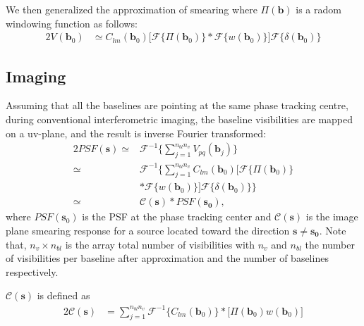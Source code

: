 We then generalized the approximation of smearing where $\Pi(\mathbf{b})$ is a radom windowing function 
as follows:
\begin{alignat*}{2}
V_{}(\mathbf{b}_0) &\simeq C_{lm}(\mathbf{b}_0)\Bigg[\mathcal{F}\Big\{\Pi(\mathbf{b}_0)\Big\}*\mathcal{F}\Big\{w(\mathbf{b}_0)\Big\}\Bigg]\mathcal{F}\Big\{\delta(\mathbf{b}_0)\Big\}
\end{alignat*}
\subsection{Imaging} 
Assuming that all the baselines are pointing at the same phase tracking centre, during conventional interferometric imaging,
the baseline visibilities are mapped on a uv-plane, and the result is inverse Fourier transformed:
\begin{alignat}{2}
PSF(\mathbf{s}) \simeq & \mathcal{F}^{-1}\Bigg\{\sum_{j=1}^{n_{bl}n_v}V_{pq}(\mathbf{b}_j)\Bigg\}\\
		\simeq & \mathcal{F}^{-1}\Bigg\{\sum_{j=1}^{n_{bl}n_v} C_{lm}(\mathbf{b}_0)\Bigg[\mathcal{F}\Big\{\Pi(\mathbf{b}_0)\Big\}\\
		&*\mathcal{F}\Big\{w(\mathbf{b}_0)\Big\}\Bigg]\mathcal{F}\Big\{\delta(\mathbf{b}_0)\Big\} \Bigg\}\\
		\simeq & \mathcal{C}(\mathbf{s})*PSF(\mathbf{s_0}),
\end{alignat}
where $PSF(\mathbf{s}_0)$ is the PSF at the phase tracking center
and $\mathcal{C}(\mathbf{s})$ is the image plane smearing response for a source
located toward the direction $\mathbf{s}\neq \mathbf{s_0}$. Note that, $n_v\times n_{bl}$ is the array 
total number of visibilities with $n_v$ and $n_{bl}$ the number of visibilities per 
baseline after approximation and the number of baselines respectively.





$\mathcal{C}(\mathbf{s})$ is defined as
\begin{alignat}{2}
\mathcal{C}(\mathbf{s}) &= \sum_{j=1}^{n_{bl}n_v}\mathcal{F}^{-1}\Big\{C_{lm}(\mathbf{b}_0)\Big\}*\Bigg[\Pi(\mathbf{b}_0)w(\mathbf{b}_0)\Bigg]
\end{alignat}



